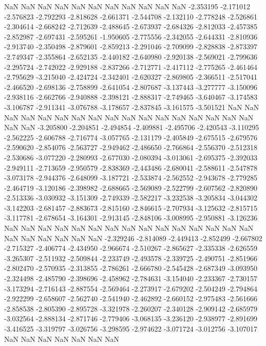 NaN
NaN
NaN
NaN
NaN
NaN
NaN
NaN
NaN
NaN
NaN
-2.353195
-2.171012
-2.576823
-2.792293
-2.818628
-2.661371
-2.544708
-2.132110
-2.778248
-2.526861
-2.304614
-2.668242
-2.712639
-2.488645
-2.673937
-2.684326
-2.812033
-2.457385
-2.852987
-2.697431
-2.595261
-1.950605
-2.775556
-2.342055
-2.644331
-2.810936
-2.913740
-2.350498
-2.879601
-2.859213
-2.291046
-2.709099
-2.828838
-2.873397
-2.749347
-2.355864
-2.652135
-2.440182
-2.640980
-2.920138
-2.569021
-2.799636
-2.295724
-2.742022
-2.929188
-2.837266
-2.712771
-2.417112
-2.775265
-2.461464
-2.795629
-3.215040
-2.424724
-2.342401
-2.620327
-2.869805
-2.366511
-2.517041
-2.466520
-2.698136
-2.758899
-2.641054
-2.807687
-3.137443
-3.277777
-3.150096
-2.938116
-2.662766
-2.940888
-2.398121
-2.888317
-2.749465
-3.640467
-3.174583
-3.106787
-2.911341
-3.076788
-3.178657
-2.837845
-3.161575
-3.501521
NaN
NaN
NaN
NaN
NaN
NaN
NaN
NaN
NaN
NaN
NaN
NaN
NaN
NaN
NaN
NaN
NaN
NaN
NaN
-3.205800
-2.204851
-2.494854
-2.409881
-2.495706
-2.420543
-3.110295
-2.562225
-2.606788
-2.716774
-3.057765
-2.131179
-2.405849
-2.675515
-2.679576
-2.590620
-2.854076
-2.563727
-2.949462
-2.486650
-2.766864
-2.556370
-2.512318
-2.530686
-3.077220
-2.280993
-2.677030
-2.080394
-3.013061
-2.695375
-2.392033
-2.949111
-2.713659
-2.950579
-2.838369
-2.443486
-2.680041
-2.588611
-2.547878
-3.073178
-2.944376
-2.648099
-3.187721
-2.533874
-2.562552
-2.943678
-2.779285
-2.464719
-3.120186
-2.398982
-2.688665
-2.569089
-2.522799
-2.607562
-2.820890
-2.513336
-3.030932
-3.151309
-2.749339
-2.582217
-3.232538
-3.205834
-3.044302
-3.142203
-2.681457
-2.883673
-2.815160
-2.846615
-2.707934
-3.125632
-2.815715
-3.117781
-2.678654
-3.164301
-2.913145
-2.848106
-3.008995
-2.950881
-3.126236
NaN
NaN
NaN
NaN
NaN
NaN
NaN
NaN
NaN
NaN
NaN
NaN
NaN
NaN
NaN
NaN
NaN
NaN
NaN
NaN
NaN
-2.329246
-2.814089
-2.449413
-2.852499
-2.667802
-2.715327
-2.406774
-2.434950
-2.966674
-2.510267
-2.865627
-2.335338
-2.626559
-3.265307
-2.511932
-2.509844
-2.233749
-2.493578
-2.339725
-2.490751
-2.851966
-2.802470
-2.570935
-2.313855
-2.786261
-2.666780
-2.545428
-2.687349
-3.093950
-2.324498
-2.485790
-2.398696
-2.458962
-2.784631
-3.154040
-2.233367
-2.730157
-3.173294
-2.716143
-2.887554
-2.569464
-2.273917
-2.679202
-2.504249
-2.794864
-2.922299
-2.658607
-2.562740
-2.541940
-2.462892
-2.660152
-2.975483
-2.561666
-2.858538
-2.805390
-2.895728
-3.321978
-2.260207
-2.340128
-2.909142
-2.685979
-3.032564
-2.888134
-2.871746
-2.779406
-3.068135
-3.236120
-2.938977
-2.891699
-3.416525
-3.319797
-3.026756
-3.298595
-2.974622
-3.071724
-3.012756
-3.107017
NaN
NaN
NaN
NaN
NaN
NaN
NaN
